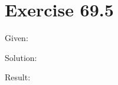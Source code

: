 \documentclass[a4paper, 10pt]{scrartcl}
\begin{document}
\section{Exercise 69.5}

Given:

Solution:

Result:
\end{document}

